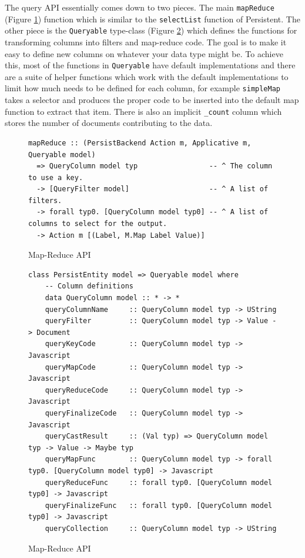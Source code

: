 \documentclass[letterpaper,twocolumn,9pt]{article}
\newcommand{\code}[1]{\texttt{#1}}
\begin{document}
The query API essentially comes down to two pieces.  The main \code{mapReduce} (Figure \ref{mrapi}) function which is similar to the \code{selectList} function of Persistent.  The other piece is the \code{Queryable} type-class (Figure \ref{queryable}) which defines the functions for transforming columns into filters and map-reduce code.  The goal is to make it easy to define new columns on whatever your data type might be.  To achieve this, most of the functions in \code{Queryable} have default implementations and there are a suite of helper functions which work with the default implementations to limit how much needs to be defined for each column, for example \code{simpleMap} takes a selector and produces the proper code to be inserted into the default map function to extract that item.  There is also an implicit \code{\_count} column which stores the number of documents contributing to the data.

\begin{figure}[t]
\begin{verbatim}
mapReduce :: (PersistBackend Action m, Applicative m, Queryable model)
  => QueryColumn model typ                 -- ^ The column to use a key.
  -> [QueryFilter model]                   -- ^ A list of filters.
  -> forall typ0. [QueryColumn model typ0] -- ^ A list of columns to select for the output.
  -> Action m [(Label, M.Map Label Value)]
\end{verbatim}
    \caption{Map-Reduce API}
    \label{mrapi}
\end{figure}

\begin{figure}[t]
\begin{verbatim}
class PersistEntity model => Queryable model where
    -- Column definitions
    data QueryColumn model :: * -> *
    queryColumnName     :: QueryColumn model typ -> UString
    queryFilter         :: QueryColumn model typ -> Value -> Document
    queryKeyCode        :: QueryColumn model typ -> Javascript
    queryMapCode        :: QueryColumn model typ -> Javascript
    queryReduceCode     :: QueryColumn model typ -> Javascript
    queryFinalizeCode   :: QueryColumn model typ -> Javascript
    queryCastResult     :: (Val typ) => QueryColumn model typ -> Value -> Maybe typ
    queryMapFunc        :: QueryColumn model typ -> forall typ0. [QueryColumn model typ0] -> Javascript
    queryReduceFunc     :: forall typ0. [QueryColumn model typ0] -> Javascript
    queryFinalizeFunc   :: forall typ0. [QueryColumn model typ0] -> Javascript
    queryCollection     :: QueryColumn model typ -> UString
\end{verbatim}
    \caption{Map-Reduce API}
    \label{queryable}
\end{figure}
\end{document}
